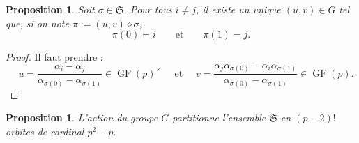 \documentclass[a4paper, titlepage]{article}
\newtheorem{prop}[theo]{Proposition}
\theoremstyle{definition}
\theoremstyle{remark}
\def\gf{\operatorname{GF}}
\begin{document}
\begin{prop}
Soit $\sigma \in \mathfrak{S}$. Pour tous $i \neq j$, il existe un unique $(u,v) \in G$ tel que, si on note $\pi := (u,v) \diamond \sigma$, $$\pi(0) = i \qquad \text{et}\qquad \pi(1) = j.$$
\end{prop}

\begin{proof}
Il faut prendre :
$$\quad u = \frac{\alpha_i - \alpha_j}{\alpha_{\sigma(0)}- \alpha_{\sigma(1)}} \in \gf(p)^\times \quad \text{ et } \quad v =  \frac{\alpha_j\alpha_{\sigma(0)} - \alpha_i\alpha_{\sigma(1)}}{\alpha_{\sigma(0)}- \alpha_{\sigma(1)}} \in \gf(p).$$
\end{proof}

\begin{prop}
L'action du groupe $G$ partitionne l'ensemble $\mathfrak{S}$ en $(p-2)!$ orbites de cardinal $p^2-p$.
\end{prop}
\end{document}
